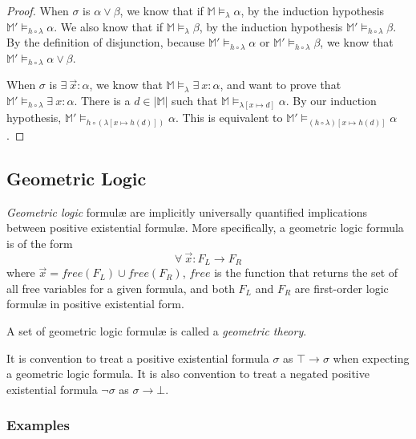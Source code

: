 \begin{proof}
			When $\sigma$ is $\alpha \vee \beta$, we know that if $\mathbb{M}
			\models_\lambda \alpha$, by the induction hypothesis $\mathbb{M}'
			\models_{h\circ\lambda} \alpha$. We also know that if $\mathbb{M}
			\models_\lambda \beta$, by the induction hypothesis $\mathbb{M}'
			\models_{h\circ\lambda} \beta$. By the definition of disjunction,
			because $\mathbb{M}' \models_{h\circ\lambda} \alpha$ or
			$\mathbb{M}' \models_{h\circ\lambda} \beta$, we know that
			$\mathbb{M}' \models_{h\circ\lambda} \alpha \vee \beta$.

			When $\sigma$ is $\exists\ \vec x : \alpha$, we know that
			$\mathbb{M} \models_\lambda \exists\ x : \alpha$, and want to prove
			that $\mathbb{M}' \models_{h\circ\lambda} \exists\ x : \alpha$.
			There is a $d \in |\mathbb{M}|$ such that $\mathbb{M}
			\models_{\lambda[x\mapsto d]} \alpha$.  By our induction
			hypothesis, $\mathbb{M}' \models_{h\circ(\lambda[x\mapsto h(d)])}
			\alpha$. This is equivalent to $\mathbb{M}'
			\models_{(h\circ\lambda)[x\mapsto h(d)]} \alpha$.

		\end{proof}

	\subsection{Geometric Logic}
	\label{sec:technical_background.geometric_logic}

		\emph{Geometric logic} formul{\ae} are implicitly universally
		quantified implications between positive existential formul{\ae}. More
		specifically, a geometric logic formula is of the form
			\[
			\forall\ \vec{x} : F_L \to F_R
			\]
		where $\vec{x} = free(F_L) \cup free(F_R)$, $free$ is the function that
		returns the set of all free variables for a given formula, and both
		$F_L$ and $F_R$ are first-order logic formul{\ae} in positive
		existential form.

		A set of geometric logic formul{\ae} is called a \emph{geometric
		theory}.

		It is convention to treat a positive existential formula $\sigma$ as
		$\top \to \sigma$ when expecting a geometric logic formula. It is also
		convention to treat a negated positive existential formula $\neg\sigma$
		as $\sigma \to \bot$.


		\subsubsection{Examples}
		\label{sec:technical_background.geometric_logic.examples}

